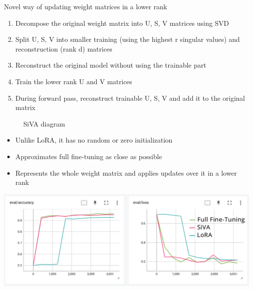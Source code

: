 \vspace{-0.5em}
Novel way of updating weight matrices in a lower rank
\begin{enumerate}
    \item Decompose the original weight matrix into U, S, V matrices using SVD
    \item Split U, S, V into smaller training (using the highest r singular values) and reconstruction (rank d) matrices
    \item Reconstruct the original model without using the trainable part
    \item Train the lower rank U and V matrices
    \item During forward pass, reconstruct trainable U, S, V and add it to the original matrix
\end{enumerate}
\vspace{-30pt}
\begin{figure}
    \centering
    
    \caption{SiVA diagram}
\end{figure}
\begin{itemize}
    \item Unlike LoRA, it has no random or zero initialization 
    \item Approximates full fine-tuning as close as possible
    \item Represents the whole weight matrix and applies updates over it in a lower rank
\end{itemize}
\includegraphics[width=\textwidth]{assets/images/siva-lora-comparison-3.png}

